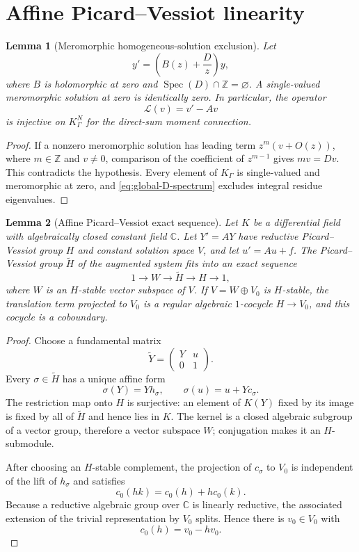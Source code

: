 \documentclass[11pt]{article}
\numberwithin{equation}{section}
\newtheorem{lemma}[lemma]{Lemma}
\theoremstyle{definition}
\theoremstyle{remark}
\newcommand{\C}{\mathbb C}
\newcommand{\Spec}{\operatorname{Spec}}
\begin{document}
\section{Affine Picard--Vessiot linearity}
\label{sec:affine}

\begin{lemma}[Meromorphic homogeneous-solution exclusion]
\label{lem:meromorphic-exclusion}
Let
\[
  y'=\left(B(z)+\frac Dz\right)y,
\]
where $B$ is holomorphic at zero and
$\Spec(D)\cap\mathbb Z=\varnothing$.  A single-valued meromorphic solution
at zero is identically zero.  In particular, the operator
\[
  \mathscr L(v)=v'-Av
\]
is injective on $K_\Gamma^N$ for the direct-sum moment connection.
\end{lemma}

\begin{proof}
If a nonzero meromorphic solution has leading term
$z^m(v+O(z))$, where $m\in\mathbb Z$ and $v\ne0$, comparison of the
coefficient of $z^{m-1}$ gives $mv=Dv$.  This contradicts the hypothesis.
Every element of $K_\Gamma$ is single-valued and meromorphic at zero, and
\eqref{eq:global-D-spectrum} excludes integral residue eigenvalues.
\end{proof}

\begin{lemma}[Affine Picard--Vessiot exact sequence]
\label{lem:affine-exact-sequence}
Let $K$ be a differential field with algebraically closed constant field
$\C$.  Let $Y'=AY$ have reductive Picard--Vessiot group $H$ and constant
solution space $V$, and let $u'=Au+f$.  The Picard--Vessiot group
$\widetilde H$ of the augmented system fits into an exact sequence
\begin{equation}\label{eq:affine-exact-sequence}
  1\longrightarrow W\longrightarrow\widetilde H
  \longrightarrow H\longrightarrow1,
\end{equation}
where $W$ is an $H$-stable vector subspace of $V$.  If
$V=W\oplus V_0$ is $H$-stable, the translation term projected to $V_0$ is
a regular algebraic $1$-cocycle $H\to V_0$, and this cocycle is a
coboundary.
\end{lemma}

\begin{proof}
Choose a fundamental matrix
\[
  \widetilde Y=
  \begin{pmatrix}Y&u\\0&1\end{pmatrix}.
\]
Every $\sigma\in\widetilde H$ has a unique affine form
\[
  \sigma(Y)=Yh_\sigma,
  \qquad
  \sigma(u)=u+Yc_\sigma.
\]
The restriction map onto $H$ is surjective: an element of $K(Y)$ fixed by
its image is fixed by all of $\widetilde H$ and hence lies in $K$.  The
kernel is a closed algebraic subgroup of a vector group, therefore a vector
subspace $W$; conjugation makes it an $H$-submodule.

After choosing an $H$-stable complement, the projection of $c_\sigma$ to
$V_0$ is independent of the lift of $h_\sigma$ and satisfies
\[
  c_0(hk)=c_0(h)+h c_0(k).
\]
Because a reductive algebraic group over $\C$ is linearly reductive, the
associated extension of the trivial representation by $V_0$ splits.  Hence
there is $v_0\in V_0$ with
\[
  c_0(h)=v_0-hv_0.
\]
\end{proof}
\end{document}
